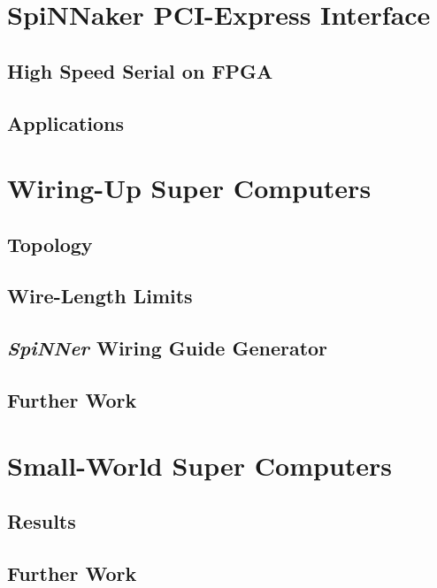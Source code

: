 \documentclass[a4paper,11pt,titlepage]{report}
\begin{document}
		\section{SpiNNaker PCI-Express Interface}
			
			\subsection{High Speed Serial on FPGA}
			
			\subsection{Applications}
		
		\section{Wiring-Up Super Computers}
			
			\subsection{Topology}
			
			\subsection{Wire-Length Limits}
			
			\subsection{\emph{SpiNNer} Wiring Guide Generator}
			
			\subsection{Further Work}
		
		\section{Small-World Super Computers}
			
			\subsection{Results}
			
			\subsection{Further Work}
		
\end{document}
